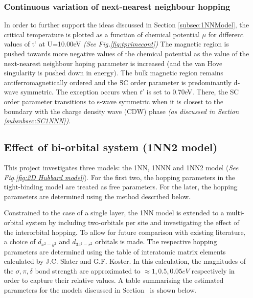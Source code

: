\documentclass[12pt]{article}
\begin{document}
\subsubsection{Continuous variation of next-nearest neighbour hopping}

In order to further support the ideas discussed in Section \ref{subsec:1NNModel}, the critical temperature
is plotted as a function of chemical potential $\mu$ for different values of t' at U=10.00eV \textit{(See Fig.\ref{fig:tprimecont})}
The magnetic region is pushed towards more negative values of the chemical potential as the value of the next-nearest 
neighbour hoping parameter is increased (and the van Hove singularity is pushed down in energy). The bulk magnetic
region remains antiferromagnetically ordered and the SC order parameter is predominantly d-wave symmetric. The exception occurs when
$t'$ is set to 0.70eV. There, the SC order parameter transitions to s-wave symmetric when it is closest to the boundary 
with the charge density wave (CDW) phase \textit{(as discussed in Section \ref{subsubsec:SC1NNN})}.

\subsection{Effect of bi-orbital system (1NN2 model)}
\label{subsec:1NN2Model}


This project investigates three models: the 1NN, 1NNN and 1NN2 model (\textit{See Fig.\ref{fig:2D Hubbard model}}). For the first two, the hopping parameters in the tight-binding model are treated as free parameters. 
For the later, the hopping parameters are determined using the method described below. \par
\medskip
\noindent Constrained to the case of a single layer, the 1NN model is extended to a multi-orbital system by
including two-orbitals per site and investigating the effect of the interorbital hopping. To allow for future comparison with
existing literature\cite{sakakibara2024possible}, a choice of $d_{x^2-y^2}$ and $d_{3z^2 -r^2}$ orbitals is made. 
The respective hopping parameters are determined using the  table of interatomic matrix elements calculated by J.C. Slater and G.F. Koster\cite{slater1954simplified}. 
In this calculation, the magnitudes of the $\sigma,  \pi, \delta$ bond strength  are approximated to  $\approx  1, 0.5, 0.05eV$ respectively in order to capture their relative values\cite{blanksby2003bond, mcgrady2015introduction, krapp2008strength}.
A table summarising the estimated parameters for the models  discussed in Section~ is shown below.
\end{document}
